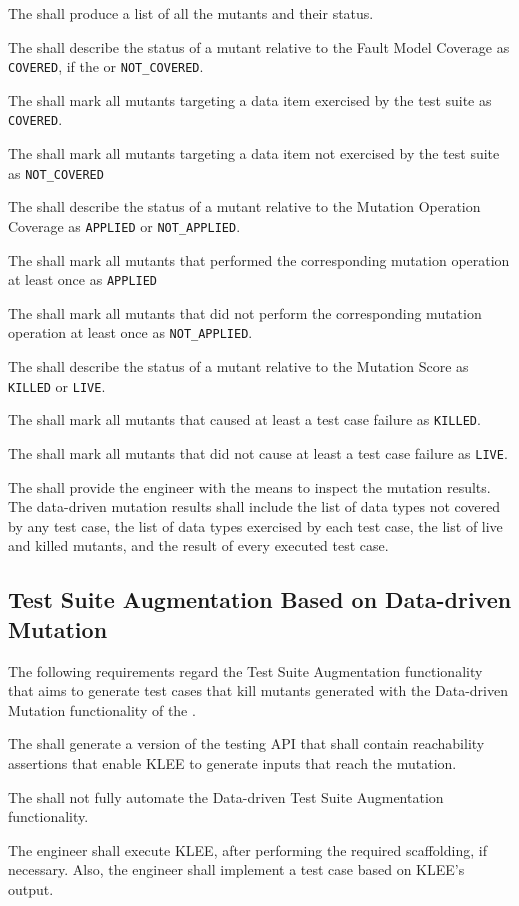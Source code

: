 \RQ{} The \FAQAS shall produce a list of all the mutants and their status.

\RQ{} The \FAQAS shall describe the status of a mutant relative to the Fault Model Coverage as \texttt{COVERED}, if the or \texttt{NOT\_COVERED}.

\RQ{} The \FAQAS shall mark all mutants targeting a data item exercised by the test suite as \texttt{COVERED}.

\RQ{} The \FAQAS shall mark all mutants targeting a data item not exercised by the test suite as \texttt{NOT\_COVERED}

\RQ{} The \FAQAS shall describe the status of a mutant relative to the Mutation Operation Coverage as \texttt{APPLIED} or \texttt{NOT\_APPLIED}.

\RQ{} The \FAQAS shall mark all mutants that performed the corresponding mutation operation at least once as \texttt{APPLIED}

\RQ{} The \FAQAS shall mark all mutants that did not perform the corresponding mutation operation at least once as \texttt{NOT\_APPLIED}.

\RQ{} The \FAQAS shall describe the status of a mutant relative to the Mutation Score as \texttt{KILLED} or \texttt{LIVE}.

\RQ{} The \FAQAS shall mark all mutants that caused at least a test case failure as \texttt{KILLED}.

\RQ{} The \FAQAS shall mark all mutants that did not cause at least a test case failure as \texttt{LIVE}.

\RQ{} The \FAQAS shall provide the engineer with the means to inspect the mutation results. The \FAQAS data-driven mutation results shall include the list of data types not covered by any test case, the list of data types exercised by each test case, the list of live and killed mutants, and the result of every executed test case.


\subsection{Test Suite Augmentation Based on Data-driven Mutation}
\label{sec:codeDrivenAugmentation}

The following requirements regard the Test Suite Augmentation functionality that aims to generate test cases that kill mutants generated with the Data-driven Mutation functionality of the \FAQAS.

\RQ{} The \FAQAS shall generate a version of the testing API that shall contain reachability assertions that enable KLEE to generate inputs that reach the mutation.

\RQ{} The \FAQAS shall not fully automate the Data-driven Test Suite Augmentation functionality.

\remark The engineer shall execute KLEE, after performing the required scaffolding, if necessary.
Also, the engineer shall implement a test case based on KLEE's output.
